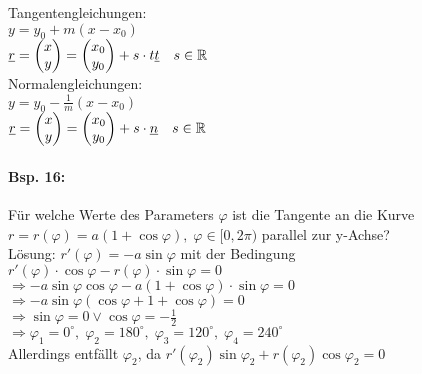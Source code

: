 Tangentengleichungen:\\
$y=y_0+m(x-x_0)$\\
$\underline{r}=\begin{pmatrix}x\\y\end{pmatrix}=\begin{pmatrix}x_0\\y_0\end{pmatrix}+s \cdot t\underline{t} \quad s\in \mathbb{R}$\\
Normalengleichungen:\\
$y=y_0-\frac{1}{m}(x-x_0)$\\
$\underline{r}=\begin{pmatrix}x\\y\end{pmatrix}=\begin{pmatrix}x_0\\y_0\end{pmatrix}+s\cdot \underline{n} \quad s \in \mathbb{R}$

\paragraph{Bsp. 16:} Für welche Werte des Parameters $\varphi$ ist die Tangente an die Kurve $r=r(\varphi)=a(1+\cos \varphi), \; \varphi \in [0,2\pi)$ parallel zur y-Achse?\\
Lösung: $r'(\varphi)=-a\sin \varphi$ mit der Bedingung $r'(\varphi)\cdot \cos \varphi - r(\varphi)\cdot \sin \varphi = 0$\\
$\Rightarrow -a \sin \varphi \cos \varphi - a(1+\cos \varphi)\cdot \sin \varphi = 0$\\
$\Rightarrow -a \sin \varphi(\cos \varphi + 1 + \cos \varphi) = 0$\\
$\Rightarrow \sin \varphi = 0 \vee \cos \varphi = -\frac{1}{2}$\\
$\Rightarrow \varphi_1=0^\circ, \; \varphi_2=180^\circ, \; \varphi_3 = 120^\circ, \; \varphi_4 = 240^\circ $\\
Allerdings entfällt $\varphi_2$, da $r'(\varphi_2)\sin\varphi_2+r(\varphi_2)\cos\varphi_2 = 0$


